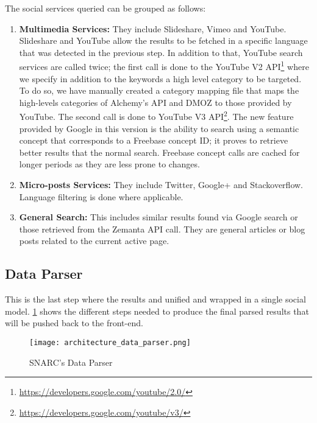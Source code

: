 The social services queried can be grouped as follows:

\begin{enumerate}
\item {\bf Multimedia Services:} They include Slideshare, Vimeo and YouTube. Slideshare and YouTube allow the results to be fetched in a specific language that was detected in the previous step. In addition to that, YouTube search services are called twice; the first call is done to the YouTube V2 API\footnote{\url{https://developers.google.com/youtube/2.0/}} where we specify in addition to the keywords a high level category to be targeted. To do so, we have manually created a category mapping file that maps the high-levels categories of Alchemy’s API and DMOZ to those provided by YouTube. The second call is done to YouTube V3 API\footnote{\url{https://developers.google.com/youtube/v3/}}. The new feature provided by Google in this version is the ability to search using a semantic concept that corresponds to a Freebase concept ID; it proves to retrieve better results that the normal search. Freebase concept calls are cached for longer periods as they are less prone to changes.

\item {\bf Micro-posts Services:} They include Twitter, Google+ and Stackoverflow. Language filtering is done where applicable.
\item {\bf General Search:} This includes similar results found via Google search or those retrieved from the Zemanta API call. They are general articles or blog posts related to the current active page.
\end{enumerate}

\subsection{Data Parser}
This is the last step where the results and unified and wrapped in a single social model. \ref{fig:architecture_data_parser} shows the different steps needed to produce the final parsed results that will be pushed back to the front-end.

\begin{figure}[!ht]
  \centering
    \texttt{[image: architecture\_data\_parser.png]}
  \caption{SNARC's Data Parser}
  \label{fig:architecture_data_parser}
\end{figure}

